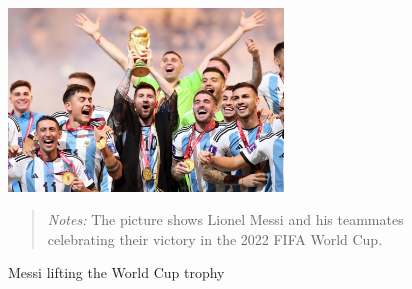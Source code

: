 \begin{figure}[ht!]
    \centering
    \includegraphics[width=0.65\textwidth]{chapter_two/graphics/messi_world_cup.jpg}
    \caption{Messi lifting the World Cup trophy}
    \label{fig:international_contributions}
    \begin{quote}
        \textit{Notes:} 
        The picture shows Lionel Messi and his teammates celebrating their victory 
        in the 2022 FIFA World Cup.
    \end{quote} 
\end{figure}
